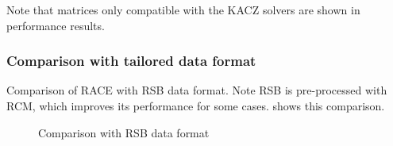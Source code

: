 Note that matrices only compatible with the \acrshort{KACZ} solvers are shown in performance results.




\subsubsection{Comparison with tailored data format}
Comparison of \acrshort{RACE} with \acrshort{RSB} data format. Note \acrshort{RSB} is pre-processed with \acrshort{RCM}, which improves its performance for some cases.  shows this comparison.

\begin{figure}[thbp]
	\centering
	\hspace{1.2em}
	\caption{Comparison with \acrshort{RSB} data format}
	\label{fig:race_vs_rsb}
\end{figure}


